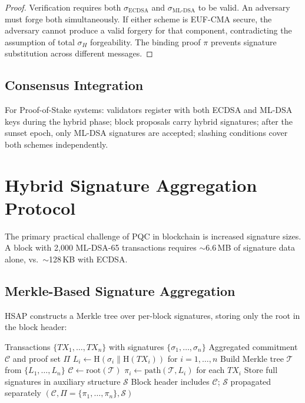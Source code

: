 \documentclass[12pt, a4paper, twocolumn]{article}
\begin{document}
\begin{proof}
Verification requires both $\sigma_{\text{ECDSA}}$ and $\sigma_{\text{ML-DSA}}$ to be valid. An adversary must forge both simultaneously. If either scheme is EUF-CMA secure, the adversary cannot produce a valid forgery for that component, contradicting the assumption of total $\sigma_H$ forgeability. The binding proof $\pi$ prevents signature substitution across different messages.
\end{proof}

\subsection{Consensus Integration}

For Proof-of-Stake systems: validators register with both ECDSA and ML-DSA keys during the hybrid phase; block proposals carry hybrid signatures; after the sunset epoch, only ML-DSA signatures are accepted; slashing conditions cover both schemes independently.

\section{Hybrid Signature Aggregation Protocol}
\label{sec:hsap}

The primary practical challenge of PQC in blockchain is increased signature sizes. A block with 2,000 ML-DSA-65 transactions requires $\sim$6.6\,MB of signature data alone, vs.\ $\sim$128\,KB with ECDSA.

\subsection{Merkle-Based Signature Aggregation}

HSAP constructs a Merkle tree over per-block signatures, storing only the root in the block header:

\begin{algorithm}[H]
\caption{HSAP Signature Aggregation}
\label{alg:hsap}
\begin{algorithmic}[1]
\REQUIRE Transactions $\{TX_1, \ldots, TX_n\}$ with signatures $\{\sigma_1, \ldots, \sigma_n\}$
\ENSURE Aggregated commitment $\mathcal{C}$ and proof set $\Pi$
\STATE $L_i \leftarrow \text{H}(\sigma_i \| \text{H}(TX_i))$ for $i = 1, \ldots, n$
\STATE Build Merkle tree $\mathcal{T}$ from $\{L_1, \ldots, L_n\}$
\STATE $\mathcal{C} \leftarrow \text{root}(\mathcal{T})$ 
\STATE $\pi_i \leftarrow \text{path}(\mathcal{T}, L_i)$ for each $TX_i$
\STATE Store full signatures in auxiliary structure $\mathcal{S}$
\STATE Block header includes $\mathcal{C}$; $\mathcal{S}$ propagated separately
\RETURN $(\mathcal{C}, \Pi = \{\pi_1, \ldots, \pi_n\}, \mathcal{S})$
\end{algorithmic}
\end{algorithm}
\end{document}

